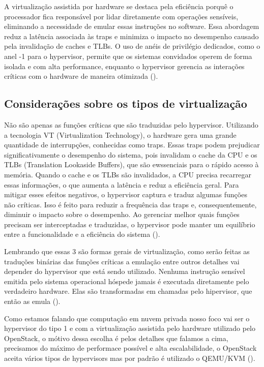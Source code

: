 A virtualização assistida por hardware se destaca pela eficiência porquê o processador fica responsável por lidar diretamente com operações sensíveis, eliminando a necessidade de emular essas instruções no software. Essa abordagem reduz a latência associada às traps e minimiza o impacto no desempenho causado pela invalidação de caches e TLBs. O uso de anéis de privilégio dedicados, como o anel -1 para o hypervisor, permite que os sistemas convidados operem de forma isolada e com alta performance, enquanto o hypervisor gerencia as interações críticas com o hardware de maneira otimizada (\cite{chirammal2016mastering}).

\subsection{Considerações sobre os tipos de virtualização}

Não são apenas as funções críticas que são traduzidas pelo hypervisor. Utilizando a tecnologia VT (Virtualization Technology), o hardware gera uma grande quantidade de interrupções, conhecidas como traps. Essas traps podem prejudicar significativamente o desempenho do sistema, pois invalidam o cache da CPU e os TLBs (Translation Lookaside Buffers), que são ewssenciais para o rápido acesso à memória. Quando o cache e os TLBs são invalidados, a CPU precisa recarregar essas informações, o que aumenta a latência e reduz a eficiência geral. Para mitigar esses efeitos negativos, o hypervisor captura e traduz algumas funções não críticas. Isso é feito para reduzir a frequência das traps e, consequentemente, diminuir o impacto sobre o desempenho. Ao gerenciar melhor quais funções precisam ser interceptadas e traduzidas, o hypervisor pode manter um equilíbrio entre a funcionalidade e a eficiência do sistema (\cite{modernOS}).

Lembrando que essas 3 são formas gerais de virtualização, como serão feitas as traduções binárias das funções críticas a emulação entre outros detalhes vai depender do hypervisor que está sendo utilizado. Nenhuma instrução sensível emitida pelo sistema operacional hóspede jamais é executada diretamente pelo verdadeiro hardware. Elas são transformadas em chamadas pelo hipervisor, que então as emula (\cite{modernOS}).

Como estamos falando que computação em nuvem privada nosso foco vai ser o hypervisor do tipo 1 e com a virtualização assistida pelo hardware utilizado pelo OpenStack, o mótivo dessa escolha é pelos detalhes que falamos a cima, precisamos do máximo de performace possível e alta escalabilidade, o OpenStack aceita vários tipos de hypervisors mas por padrão é utilizado o QEMU/KVM (\cite{DocumentacaoOpenstack}).


